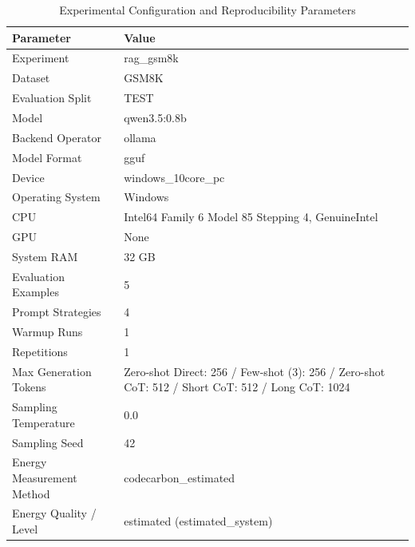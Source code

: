 \begin{table}
\caption{Experimental Configuration and Reproducibility Parameters}
\label{tab:experimental_configuration}
\begin{tabular}{ll}
\toprule
Parameter & Value \\
\midrule
Experiment & rag\_gsm8k \\
Dataset & GSM8K \\
Evaluation Split & TEST \\
Model & qwen3.5:0.8b \\
Backend Operator & ollama \\
Model Format & gguf \\
Device & windows\_10core\_pc \\
Operating System & Windows \\
CPU & Intel64 Family 6 Model 85 Stepping 4, GenuineIntel \\
GPU & None \\
System RAM & 32 GB \\
Evaluation Examples & 5 \\
Prompt Strategies & 4 \\
Warmup Runs & 1 \\
Repetitions & 1 \\
Max Generation Tokens & Zero-shot Direct: 256 / Few-shot (3): 256 / Zero-shot CoT: 512 / Short CoT: 512 / Long CoT: 1024 \\
Sampling Temperature & 0.0 \\
Sampling Seed & 42 \\
Energy Measurement Method & codecarbon\_estimated \\
Energy Quality / Level & estimated (estimated\_system) \\
\bottomrule
\end{tabular}
\end{table}
